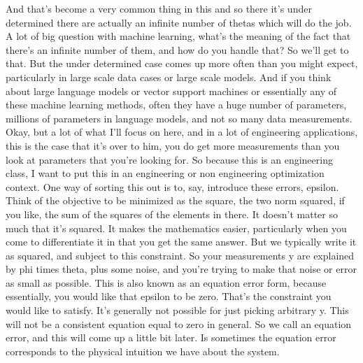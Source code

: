 \documentclass[11pt,a4paper]{article}
\begin{document}
And that's become a very common thing in this and so there it's under determined there are actually an infinite number of thetas which will do the job. A lot of big question with machine learning, what's the meaning of the fact that there's an infinite number of them, and how do you handle that? So we'll get to that. But the under determined case comes up more often than you might expect, particularly in large scale data cases or large scale models. And if you think about large language models or vector support machines or essentially any of these machine learning methods, often they have a huge number of parameters, millions of parameters in language models, and not so many data measurements. Okay, but a lot of what I'll focus on here, and in a lot of engineering applications, this is the case that it's over to him, you do get more measurements than you look at parameters that you're looking for. So because this is an engineering class, I want to put this in an engineering or non engineering optimization context. One way of sorting this out is to, say, introduce these errors, epsilon. Think of the objective to be minimized as the square, the two norm squared, if you like, the sum of the squares of the elements in there. It doesn't matter so much that it's squared. It makes the mathematics easier, particularly when you come to differentiate it in that you get the same answer. But we typically write it as squared, and subject to this constraint. So your measurements y are explained by phi times theta, plus some noise, and you're trying to make that noise or error as small as possible. This is also known as an equation error form, because essentially, you would like that epsilon to be zero. That's the constraint you would like to satisfy. It's generally not possible for just picking arbitrary y. This will not be a consistent equation equal to zero in general. So we call an equation error, and this will come up a little bit later. Is sometimes the equation error corresponds to the physical intuition we have about the system.
\end{document}
